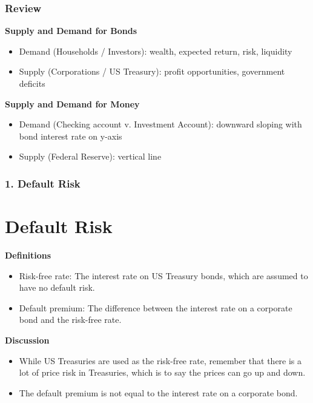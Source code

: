 \documentclass{beamer}
\begin{document}
\begin{frame}[t]
    \frametitle{Review}

    \textbf{Supply and Demand for Bonds}
    \begin{itemize}
        \item Demand (Households / Investors): wealth, expected return, risk, liquidity
        \item Supply (Corporations / US Treasury): profit opportunities, government deficits
    \end{itemize}
    
    \textbf{Supply and Demand for Money}
    \begin{itemize}
        \item Demand (Checking account v. Investment Account): downward sloping with bond interest rate on y-axis
        \item Supply (Federal Reserve): vertical line
    \end{itemize}

\end{frame}

\begin{frame}
    \frametitle{1. Default Risk}
    \section{Default Risk}

    \textbf{Definitions}
    \begin{itemize}
        \item Risk-free rate: The interest rate on US Treasury bonds, which are assumed to have no default risk.
        \item Default premium: The difference between the interest rate on a corporate bond and the risk-free rate.
    \end{itemize}
    \vspace{1em}
    
        \textbf{Discussion}
    \begin{itemize}
        \item While US Treasuries are used as the risk-free rate, remember that there is a lot of price risk in Treasuries, which is to say the prices can go up and down.
        \item The default premium is not equal to the interest rate on a corporate bond.
    \end{itemize}

\end{frame}
\end{document}
